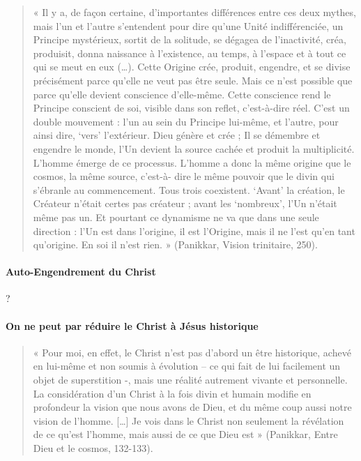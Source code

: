 \begin{quote}
    
« Il y a, de façon certaine, d’importantes différences entre ces deux mythes, mais l’un et l’autre 
s’entendent pour dire qu’une Unité indifférenciée, un Principe mystérieux, sortit de la solitude, 
se dégagea de l’inactivité, créa, produisit, donna naissance à l’existence, au temps, à l’espace et 
à tout ce qui se meut en eux (…). Cette Origine crée, produit, engendre, et se divise précisément 
parce qu’elle ne veut pas être seule. Mais ce n’est possible que parce qu’elle devient conscience 
d’elle-même. Cette conscience rend le Principe conscient de soi, visible dans son reflet, 
c’est-à-dire réel. C’est un double mouvement : l’un au sein du Principe lui-même, et l’autre, pour 
ainsi dire, ‘vers’ l’extérieur. Dieu génère et crée ; Il se démembre et engendre le monde, l’Un 
devient la source cachée et produit la multiplicité. L’homme émerge de ce processus. L’homme a donc 
la même origine que le cosmos, la même source, c’est-à- dire le même pouvoir que le divin qui 
s’ébranle au commencement. Tous trois coexistent. ‘Avant’ la création, le Créateur n’était certes 
pas créateur ; avant les ‘nombreux’, l’Un n’était même pas un. Et pourtant ce dynamisme ne va que 
dans une seule direction : l’Un est dans l’origine, il est l’Origine, mais il ne l’est qu’en tant 
qu’origine. En soi il n’est rien. » (Panikkar, Vision trinitaire, 250).

\end{quote}

\paragraph{Auto-Engendrement du Christ} ?


\paragraph{On ne peut par réduire le Christ à Jésus historique}


\begin{quote}
    
« Pour moi, en effet, le Christ n’est pas d’abord un être historique, achevé en lui-même et non 
soumis à évolution – ce qui fait de lui facilement un objet de superstition -, mais une réalité 
autrement vivante et personnelle. La considération d’un Christ à la fois divin et humain modifie en 
profondeur la vision que nous avons de Dieu, et du même coup aussi notre vision de l’homme. […] Je 
vois dans le Christ non seulement la révélation de ce qu’est l’homme, mais aussi de ce que Dieu est 
» (Panikkar, Entre Dieu et le cosmos, 132-133).
\end{quote}
